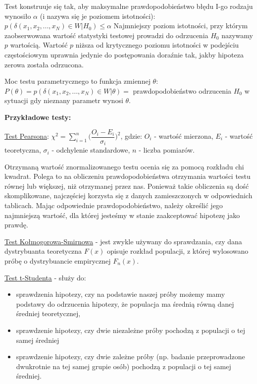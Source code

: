 Test konstruuje się tak, aby maksymalne prawdopodobieństwo błędu I-go rodzaju wynosiło  $ \alpha $ (i nazywa się je poziomem istotności):\newline
$ p(\delta (x_1, x_2,..., x_N) \in W | H_0) \le \alpha $\newline
Najmniejszy poziom istotności, przy którym zaobserwowana wartość statystyki testowej prowadzi do odrzucenia $ H_0 $ nazywamy $ p $ wartością. Wartość $ p $ niższa od krytycznego poziomu istotności w podejściu częstościowym uprawnia jedynie do postępowania doraźnie tak, jakby hipoteza zerowa została odrzucona.

Moc testu parametrycznego to funkcja zmiennej $ \theta $:\newline
$ P(\theta) = p (\delta (x_1, x_2,..., x_N) \in W | \theta ) = $ prawdopodobieństwo odrzucenia $ H_0 $ w sytuacji gdy nieznany parametr wynosi $ \theta $.

\textbf{Przykładowe testy:}

\underline{Test Pearsona}:\newline
$ \chi^2 = \sum\limits_{i=1}^n \big( \dfrac{O_i - E_i}{\sigma_i} \big)^2 $, gdzie:\newline
$ O_i $ - wartość mierzona,\newline
$ E_i $ - wartość teoretyczna,\newline
$ \sigma_i $ - odchylenie standardowe,\newline
$ n $ - liczba pomiarów.

Otrzymaną wartość znormalizowanego testu ocenia się za pomocą rozkładu chi kwadrat. Polega to na obliczeniu prawdopodobieństwa otrzymania wartości testu równej lub większej, niż otrzymanej przez nas. Ponieważ takie obliczenia są dość skomplikowane, najczęściej korzysta się z danych zamieszczonych w odpowiednich tablicach. Mając odpowiednie prawdopodobieństwo, należy określić jego najmniejszą wartość, dla której jesteśmy w stanie zaakceptować hipotezę jako prawdę.

\underline{Test Kołmogorowa-Smirnowa} - jest zwykle używany do sprawdzania, czy dana dystrybuanta teoretyczna $ F(x) $ opisuje rozkład populacji, z której wylosowano próbę o dystrybuancie empirycznej $ F_n(x) $.

\underline{Test t-Studenta} - służy do:
\begin{itemize}
	\item sprawdzenia hipotezy, czy na podstawie naszej próby możemy mamy podstawy do odrzucenia hipotezy, że populacja ma średnią równą danej średniej teoretycznej,
	\item sprawdzenie hipotezy, czy dwie niezależne próby pochodzą z populacji o tej samej średniej
	\item sprawdzenie hipotezy, czy dwie zależne próby (np. badanie przeprowadzone dwukrotnie na tej samej grupie osób) pochodzą z populacji o tej samej średniej.
\end{itemize}


